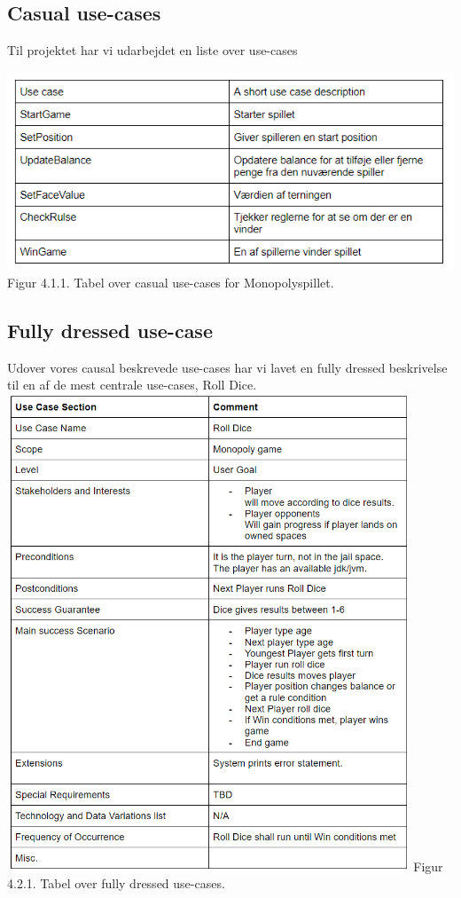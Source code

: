 \begin{flushleft}
\subsection{Casual use-cases}
\doublespacing


Til projektet har vi udarbejdet en liste over use-cases

\includegraphics[width=1\textwidth]{Report/figures/Use case.PNG}
Figur 4.1.1. Tabel over casual use-cases for Monopolyspillet.
\newpage
\subsection{Fully dressed use-case}
Udover vores causal beskrevede use-cases har vi lavet en fully dressed beskrivelse til en af de mest centrale use-cases, Roll Dice.
\addlinespace
\includegraphics[width=0.9\textwidth]{Report/figures/Fullyusecase.png}
Figur 4.2.1. Tabel over fully dressed use-cases.


\end{flushleft}
